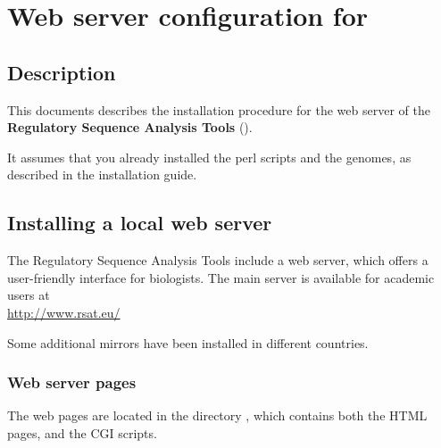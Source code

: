 \documentclass[12pt,a4paper, twoside]{scrreprt} %
\begin{document}


\newpage
\tableofcontents
\newpage

\chapter{Web server configuration for \RSAT}

\section{Description}

This documents describes the installation procedure for the web server
of the \textbf{Regulatory Sequence Analysis Tools} (\RSAT).

It assumes that you already installed the perl scripts and the
genomes, as described in the \RSAT installation guide.


\section{Installing a local web server}

The Regulatory Sequence Analysis Tools include a web server, which
offers a user-friendly interface for biologists. The main server is
available for academic users at \\
\url{http://www.rsat.eu/}

Some additional mirrors have been installed in different countries.

\subsection{Web server pages}

The web pages are located in the directory ,
which contains both the HTML pages, and the CGI scripts.
\end{document}
